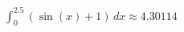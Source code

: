 \documentclass[preview]{standalone}
\begin{document}
\begin{align*}
\int_{0}^{2.5} \left(\sin(x) + 1\right) \, dx \approx 4.30114
\end{align*}
\end{document}
